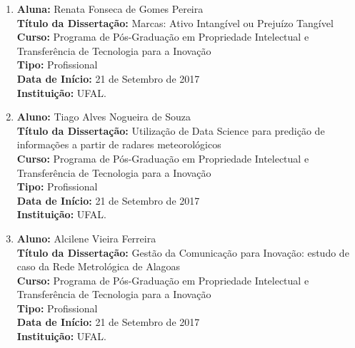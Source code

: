 \documentclass[a4paper,oneside,10pt]{article}
\begin{document}
\begin{enumerate}
\item   \textbf{Aluna:} Renata Fonseca de Gomes Pereira \mbox{} \\
            \textbf{Título da Dissertação:} Marcas: Ativo Intangível ou Prejuízo Tangível\\
            \textbf{Curso:} Programa de Pós-Graduação em Propriedade Intelectual e Transferência de Tecnologia para a Inovação \\%
            \textbf{Tipo:} Profissional \\%
            \textbf{Data de Início:} 21 de Setembro de 2017\\
            \textbf{Instituição:} UFAL.            
      
\item   \textbf{Aluno:} Tiago Alves Nogueira de Souza \mbox{} \\
            \textbf{Título da Dissertação:} Utilização de Data Science para predição de informações a partir de radares meteorológicos\\
            \textbf{Curso:} Programa de Pós-Graduação em Propriedade Intelectual e Transferência de Tecnologia para a Inovação \\%
            \textbf{Tipo:} Profissional \\%
            \textbf{Data de Início:} 21 de Setembro de 2017\\
            \textbf{Instituição:} UFAL.  
          
\item  \textbf{Aluno:} Alcilene Vieira Ferreira \mbox{} \\
            \textbf{Título da Dissertação:} Gestão da Comunicação para Inovação: estudo de caso da Rede Metrológica de Alagoas\\
            \textbf{Curso:} Programa de Pós-Graduação em Propriedade Intelectual e Transferência de Tecnologia para a Inovação \\%
            \textbf{Tipo:} Profissional \\%
            \textbf{Data de Início:} 21 de Setembro de 2017\\
            \textbf{Instituição:} UFAL.  
             

\end{enumerate}
\end{document}
